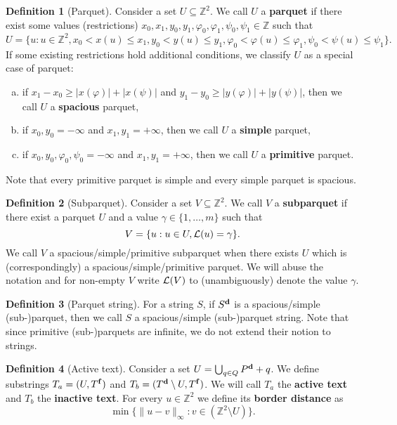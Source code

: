\documentclass[11pt]{article}
\newcommand{\Z}{\mathbb{Z}}
\renewcommand{\phi}{\varphi}
\newcommand{\set}[1]{\lbrace #1 \rbrace}
\theoremstyle{plain}
\theoremstyle{definition}
\newtheorem{definition}{Definition}
\begin{document}
\begin{definition}[Parquet]
	Consider a set $U \subseteq \Z^2$. We call $U$ a \textbf{parquet} if there exist some values (restrictions) $x_0, x_1, y_0, y_1, \phi_0, \phi_1, \psi_0, \psi_1 \in \Z$ such that
	$$ U = \set{u : u \in \Z^2, x_0 < x(u) \le x_1, y_0 < y(u) \le y_1, \phi_0 < \phi(u) \le \phi_1, \psi_0 < \psi(u) \le \psi_1}. $$
	If some existing restrictions hold additional conditions, we classify $U$ as a special case of parquet:
	\begin{enumerate}[a)]
		\item if $x_1 - x_0 \ge |x(\phi)| + |x(\psi)|$ and $y_1 - y_0 \ge |y(\phi)| + |y(\psi)|$, then we call $U$ a \textbf{spacious} parquet,
		\item if $x_0, y_0 = -\infty$ and $x_1, y_1 = +\infty$, then we call $U$ a \textbf{simple} parquet,
		\item if $x_0, y_0, \phi_0, \psi_0 = -\infty$ and $x_1, y_1 = +\infty$, then we call $U$ a \textbf{primitive} parquet.
	\end{enumerate}
	Note that every primitive parquet is simple and every simple parquet is spacious.
\end{definition}


\begin{definition}[Subparquet]
	Consider a set $V \subseteq \Z^2$. 
	We call $V$ a \textbf{subparquet} if there exist a parquet $U$ and a value $\gamma \in \set{1, \dots, m}$ such that
	$$ V = \set{u : u \in U, \L(u) = \gamma}.$$
	We call $V$ a spacious/simple/primitive subparquet when there exists $U$ which is (correspondingly) a spacious/simple/primitive parquet.
	We will abuse the notation and for non-empty $V$ write $\mathcal{L}(V)$ to (unambiguously) denote the value $\gamma$. 
\end{definition}


\begin{definition}[Parquet string]
	For a string $S$, if $S^\mathbf{d}$ is a spacious/simple (sub-)parquet, then we call $S$ a spacious/simple (sub-)parquet string.
	Note that since primitive (sub-)parquets are infinite, we do not extend their notion to strings.
\end{definition}


\newcommand{\Ta}{T_a}
\newcommand{\Tb}{T_b}
\begin{definition}[Active text]
	Consider a set $U = \bigcup_{q \in Q} P^\mathbf{d} + q$. 
	We define substrings $\Ta = (U, \f{T})$ and $\Tb = (\d{T} \setminus U, \f{T})$.
	We will call $\Ta$ the \textbf{active text} and $\Tb$ the \textbf{inactive text}.
	For every $u \in \Z^2$ we define its \textbf{border distance} as
	$$\min\set{\|u - v\|_\infty : v \in (\Z^2 \setminus U)}.$$
\end{definition}
\end{document}
